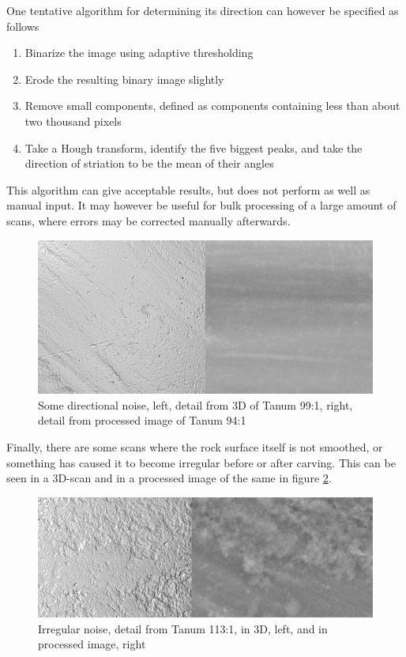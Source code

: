 \documentclass[a4paper,reqno,oneside]{amsart} %
\theoremstyle{definition}
\theoremstyle{remark}
\numberwithin{equation}{section}
\begin{document}
One tentative algorithm for determining its direction can however be specified as follows
\begin{enumerate}
    \item Binarize the image using adaptive thresholding
    \item Erode the resulting binary image slightly
    \item Remove small components, defined as components containing less than about two thousand pixels
    \item Take a Hough transform, identify the five biggest peaks, and take the direction of striation to be the mean of their angles
\end{enumerate}

This algorithm can give acceptable results, but does not perform as well as manual input. It may however be useful for bulk processing of a large amount of scans, where errors may be corrected manually afterwards.

\begin{figure}[!htb]
\centering
\includegraphics[scale=.35]{directed.png}
\caption{Some directional noise, left, detail from 3D of Tanum 99:1, right, detail from processed image of Tanum 94:1}
\label{fig:directed}
\end{figure}


Finally, there are some scans where the rock surface itself is not smoothed, or something has caused it to become irregular before or after carving. This can be seen in a 3D-scan and in a processed image of the same in figure \ref{fig:irregular}.

\begin{figure}[!htb]
\centering
\includegraphics[scale=.5]{roughness_t113_1.png}
\caption{Irregular noise, detail from Tanum 113:1, in 3D, left, and in processed image, right}
\label{fig:irregular}
\end{figure}
\end{document}
